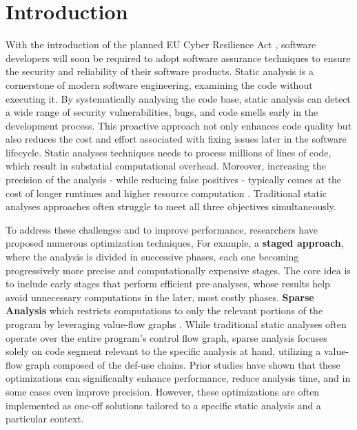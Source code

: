 \section{Introduction}
With the introduction of the planned EU Cyber Resilience Act \cite{car2022eu}, software developers will soon be required to adopt software assurance techniques to ensure the security and reliability of their software products.
Static analysis is a cornerstone of modern software engineering, examining the code without executing it.
By systematically analysing the code base, static analysis can detect a wide range of security vulnerabilities, bugs, and code smells early in the development process.
This proactive approach not only enhances code quality but also reduces the cost and effort associated with fixing issues later in the software lifecycle.
Static analyses techniques needs to process millions of lines of code, which result in substatial computational overhead.
Moreover, increasing the precision of the analysis - while reducing false positives - typically comes at the cost of longer runtimes and higher resource computation \cite{emanuelsson2008comparative}.
Traditional static analyses approaches often struggle to meet all three objectives simultaneously.

To address these challenges and to improve performance, researchers have proposed numerous optimization techniques, 
For example, a \textbf{staged approach}, where the analysis is divided in successive phases,
each one becoming progressively more precise and computationally expensive stages\cite{bodden2009verifying,bodden2012partially,jeong2017datadriven,li2018precision,lu2019precision,sinha2010staged,smaragdakis2014introspective}.
The core idea is to include early stages that perform efficient pre-analyses, whose results help avoid unnecessary computations in the later, most costly phases.
\textbf{Sparse Analysis} which restricts computations to only the relevant portions of the program by leveraging value-flow graphs \cite{choi1991automatic,madsen2014sparse,ramalingam2002sparse,spaeth2017ideal}.
While traditional static analyses often operate over the entire program's control flow graph, sparse analysis focuses solely on code segment relevant to the specific analysis at hand, utilizing a value-flow graph composed of the def-use chains.
Prior studies have shown that these optimizations can significanlty enhance performance, reduce analysis time, and in some cases even improve precision. 
However, these optimizations are often implemented as one-off solutions tailored to a specific static analysis and a particular context.

